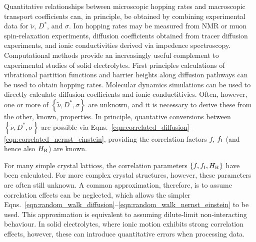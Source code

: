 \documentclass[aps,prb,twocolumn,superscriptaddress,reprint]{revtex4-1}
\newcommand{\set}[1]{\left\{#1\right\}}
\newcommand{\hrpa}{{\widetilde{\nu}}}
\begin{document}
Quantitative relationships between microscopic hopping rates and macroscopic transport coefficients can, in principle, be obtained by combining experimental data for $\hrpa$, $D^*$, and $\sigma$. 
Ion hopping rates may be measured from NMR or muon spin-relaxation experiments,\cite{WilkeningEtAl_PhysRevLett2006, RuprechtEtAl_PhysChemChemPhys2012, Enciso-MaldonadoEtAl_ChemMater2015,Santibanez-MendietaEtAl_ChemMater2016, NozakiEtAl_SolStatIonics2014,AmoresEtAl_JMaterChemA2016} diffusion coefficients obtained from tracer diffusion experiments,\cite{BaylissEtAl_AdvEnergyMater2014} and ionic conductivities derived via impedence spectroscopy.\cite{ZeierEtAl_ACSApplMaterInt2014,Lopez-BermudezEtAl_2016} Computational methods provide an increasingly useful complement to experimental studies of solid electrolytes. 
First principles calculations of vibrational partition functions and barrier heights along diffusion pathways can be used to obtain hopping rates.\cite{VanDerVenEtAl_PhysRevB2001, MantinaEtAl_PhysRevLett2008} Molecular dynamics simulations can be used to directly calculate diffusion coefficients and ionic conductitivies.\cite{MorganAndMadden_JPhysCondensMat2012} Often, however, one or more of $\set{\hrpa,D^*,\sigma}$ are unknown, and it is necessary to derive these from the other, known, properties. In principle, quantative conversions between $\set{\hrpa,D^*,\sigma}$ are possible via Eqns.~\ref{eqn:correlated_diffusion}--\ref{eqn:correlated_nernst_einstein}, providing the correlation factors $f$, $f_{\mathrm{I}}$ (and hence also $H_{\mathrm{R}}$) are known.

For many simple crystal lattices, the correlation parameters $\set{f, f_\m{I}, H_\m{R}}$ have been calculated.\cite{Friauf_JApplPhys1962,Murch_SolStatIonics1982} For more complex crystal structures, however, these parameters are often still unknown. A common approximation, therefore, is to assume correlation effects can be neglected, which allows the simpler Eqns.~\ref{eqn:random_walk_diffusion}--\ref{eqn:random_walk_nernst_einstein} to be used. This approximation is equivalent to assuming dilute-limit non-interacting behaviour. In solid electrolytes, where ionic motion exhibits strong correlation effects, however, these can introduce quantitative errors when processing data.
\end{document}
